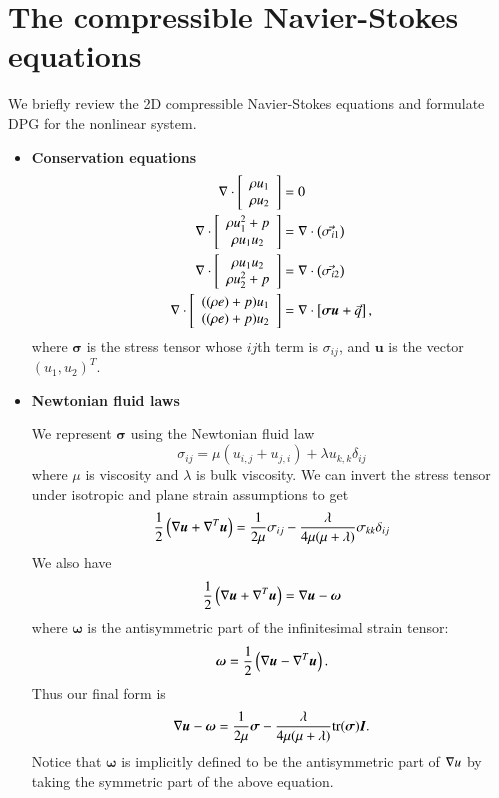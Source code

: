 \section{The compressible Navier-Stokes equations}

We briefly review the 2D compressible Navier-Stokes equations and formulate DPG for the nonlinear system. 
\begin{itemize}
\item \textbf{Conservation equations}
\begin{align*}
\div \vecttwo{\rho u_1 }{\rho u_2} &= 0\\
\div \vecttwo{\rho u_1^2+p }{\rho u_1 u_2} &= \div\left(\vec{\sigma_{i1}}\right)\\
\div \vecttwo{\rho u_1 u_2}{\rho u_2^2+p } &= \div\left(\vec{\sigma_{i2}}\right)\\
\div\vecttwo{((\rho e)+p)u_1}{((\rho e)+p)u_2} &= \div\left[\boldsymbol\sigma \boldsymbol u + \vec{q}\right],
\end{align*}
where $\boldsymbol \sigma$ is the stress tensor whose $ij$th term is $\sigma_{ij}$, and $\boldsymbol u$ is the vector $(u_1,u_2)^T$.  

\item \textbf{Newtonian fluid laws}

We represent $\boldsymbol\sigma$ using the Newtonian fluid law
\[
\sigma_{ij} = \mu(u_{i,j} + u_{j,i}) + \lambda u_{k,k} \delta_{ij}
\]
where $\mu$ is viscosity and $\lambda$ is bulk viscosity. 
We can invert the stress tensor under isotropic and plane strain assumptions to get
\[
\frac{1}{2}\left(\grad  \boldsymbol u + \grad ^T  \boldsymbol u\right) = \frac{1}{2\mu} \sigma_{ij} - \frac{\lambda}{4\mu (\mu + \lambda)} \sigma_{kk}\delta_{ij}
\]
We also have
\[
\frac{1}{2}\left(\grad  \boldsymbol u + \grad ^T  \boldsymbol u\right) = \grad  \boldsymbol u - \boldsymbol \omega
\]
where $\boldsymbol \omega$ is the antisymmetric part of the infinitesimal strain tensor:
\[
\boldsymbol \omega = \frac{1}{2}\left(\grad  \boldsymbol u - \grad ^T  \boldsymbol u\right).
\]
Thus our final form is
\begin{align*}
\grad  \boldsymbol u - \boldsymbol \omega = \frac{1}{2\mu} \boldsymbol \sigma - \frac{\lambda}{4\mu (\mu + \lambda)} { \rm tr}(\boldsymbol \sigma) \boldsymbol I.
\end{align*}
Notice that $\boldsymbol \omega$ is implicitly defined to be the antisymmetric part of $\grad u$ by taking the symmetric part of the above equation. 


\end{itemize}
